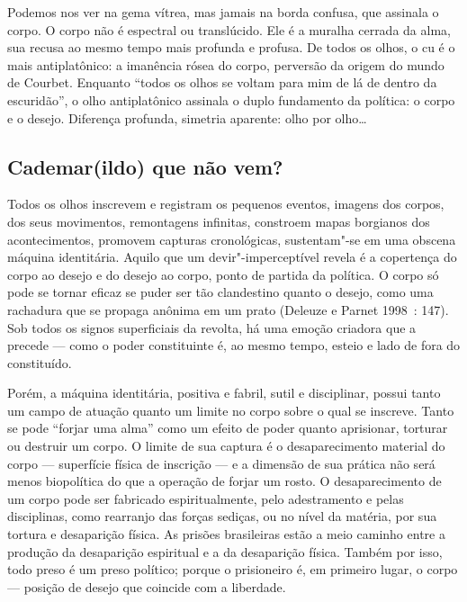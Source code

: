 Podemos nos ver na gema vítrea, mas jamais na borda confusa, que
assinala o corpo. O corpo não é espectral ou translúcido. Ele é a
muralha cerrada da alma, sua recusa ao mesmo tempo mais profunda e
profusa. De todos os olhos, o cu é o mais antiplatônico: a imanência
rósea do corpo, perversão da origem do mundo de Courbet. Enquanto
``todos os olhos se voltam para mim de lá de dentro da escuridão'', o
olho antiplatônico assinala o duplo fundamento da política: o corpo e o
desejo. Diferença profunda, simetria aparente: olho por olho\ldots{}

\subsection{Cademar(ildo) que não vem?}

Todos os olhos inscrevem e
registram os pequenos eventos, imagens dos corpos, dos seus movimentos,
remontagens infinitas, constroem mapas borgianos dos acontecimentos,
promovem capturas cronológicas, sustentam"-se em uma obscena máquina
identitária. Aquilo que um devir"-imperceptível revela é a copertença do
corpo ao desejo e do desejo ao corpo, ponto de partida da política. O
corpo só pode se tornar eficaz se puder ser tão clandestino quanto o
desejo, como uma rachadura que se propaga anônima em um prato (Deleuze e
Parnet 1998~: 147). Sob todos os signos superficiais da revolta, há uma
emoção criadora que a precede --- como o poder constituinte é, ao mesmo
tempo, esteio e lado de fora do constituído.

Porém, a máquina identitária, positiva e fabril, sutil e disciplinar,
possui tanto um campo de atuação quanto um limite no corpo sobre o qual
se inscreve. Tanto se pode ``forjar uma alma'' como um efeito de poder
quanto aprisionar, torturar ou destruir um corpo. O limite de sua
captura é o desaparecimento material do corpo --- superfície física de
inscrição --- e a dimensão de sua prática não será menos biopolítica do
que a operação de forjar um rosto. O desaparecimento de um corpo pode
ser fabricado espiritualmente, pelo adestramento e pelas disciplinas,
como rearranjo das forças sediças, ou no nível da matéria, por sua
tortura e desaparição física. As prisões brasileiras estão a meio
caminho entre a produção da desaparição espiritual e a da desaparição
física. Também por isso, todo preso é um preso político; porque o
prisioneiro é, em primeiro lugar, o corpo --- posição de desejo que
coincide com a liberdade.

